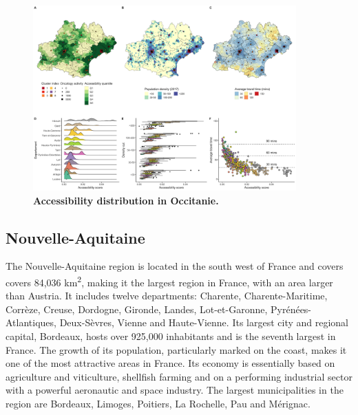 \begin{figure}[H]
    \includegraphics[width=0.9\textwidth]{images/camion/region_accessibility/accessibility_Occitanie.png}
    \centering
    \caption{
        \textbf{Accessibility distribution in Occitanie.}
    }
\end{figure}

\subsection*{Nouvelle-Aquitaine}

The Nouvelle-Aquitaine region is located in the south west of France and covers covers 84,036 km\textsuperscript{2}, making it the largest region in France, with an area larger than Austria. It includes twelve departments: Charente, Charente-Maritime, Corrèze, Creuse, Dordogne, Gironde, Landes, Lot-et-Garonne, Pyrénées-Atlantiques, Deux-Sèvres, Vienne and Haute-Vienne. Its largest city and regional capital, Bordeaux, hosts over 925,000 inhabitants and is the seventh largest in France. The growth of its population, particularly marked on the coast, makes it one of the most attractive areas in France.
Its economy is essentially based on agriculture and viticulture, shellfish farming and on a performing industrial sector with a powerful aeronautic and space industry. The largest municipalities in the region are Bordeaux, Limoges, Poitiers, La Rochelle, Pau and Mérignac.

